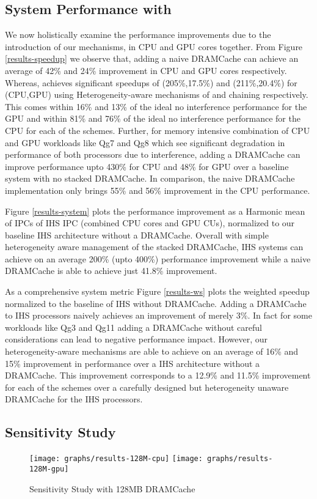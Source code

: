 \subsection{System Performance with \cachename}
We now holistically examine the performance improvements due to the introduction of our \cachename mechanisms, in  CPU and GPU cores together. From Figure \ref{results-speedup} we observe that, adding a naive DRAMCache can achieve an average of 42\% and 24\% improvement in CPU and GPU cores respectively. Whereas, \cachename achieves significant speedups of (205\%,17.5\%) and (211\%,20.4\%) for (CPU,GPU) using Heterogeneity-aware mechanisms of \bypassname and chaining respectively. This comes within 16\% and 13\% of the ideal no interference performance for the GPU and within 81\% and 76\% of the ideal no interference performance for the CPU for each of the schemes. Further, for memory intensive combination of CPU and GPU workloads like Qg7 and Qg8 which see significant degradation in performance of both processors due to interference, adding a DRAMCache can improve performance upto 430\% for CPU and 48\% for GPU over a baseline system with no stacked DRAMCache. In comparison, the naive DRAMCache implementation only brings 55\% and 56\% improvement in the CPU performance. 
\par Figure \ref{results-system} plots the performance improvement as a Harmonic mean of IPCs of IHS IPC (combined CPU cores and GPU CUs), normalized to our baseline IHS architecture without a DRAMCache. Overall with simple heterogeneity aware management of the stacked DRAMCache, IHS systems can achieve on an average 200\% (upto 400\%) performance improvement while a naive DRAMCache is able to achieve just 41.8\% improvement.
\par As a comprehensive system metric Figure \ref{results-ws} plots the weighted speedup normalized to the baseline of IHS without DRAMCache. Adding a DRAMCache to IHS processors naively achieves an improvement of merely 3\%. In fact for some workloads like Qg3 and Qg11 adding a DRAMCache without careful considerations can lead to negative performance impact. However, our heterogeneity-aware mechanisms are able to achieve on an average of 16\% and 15\%  improvement in performance over a IHS architecture without a DRAMCache. This improvement corresponds to a 12.9\% and 11.5\% improvement for each of the schemes over a carefully designed but heterogeneity unaware DRAMCache for the IHS processors.

\subsection{Sensitivity Study}
\begin{figure}[!htb]
    \centering
    \texttt{[image: graphs/results-128M-cpu]}
    \texttt{[image: graphs/results-128M-gpu]}
    \caption{Sensitivity Study with 128MB DRAMCache}
    \label{results-128m}
\end{figure}